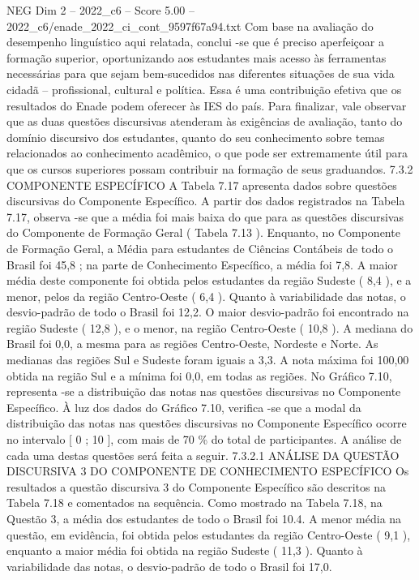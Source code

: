 \begin{textsample}{NEG Dim 2 – 2022\_c6 – Score 5.00 – 2022\_c6/enade\_2022\_ci\_cont\_9597f67a94.txt}
Com base na avaliação do desempenho linguístico aqui relatada, conclui -se que é preciso aperfeiçoar a formação superior, oportunizando aos estudantes mais acesso às ferramentas necessárias para que sejam bem-sucedidos nas diferentes situações de sua vida cidadã – profissional, cultural e política.
Essa é uma contribuição efetiva que os resultados do Enade podem oferecer às IES do país.
Para finalizar, vale observar que as duas questões discursivas atenderam às exigências de avaliação, tanto do domínio discursivo dos estudantes, quanto do seu conhecimento sobre temas relacionados ao conhecimento acadêmico, o que pode ser extremamente útil para que os cursos superiores possam contribuir na formação de seus graduandos. 7.3.2 COMPONENTE ESPECÍFICO A Tabela 7.17 apresenta dados sobre questões discursivas do Componente Específico.
A partir dos dados registrados na Tabela 7.17, observa -se que a média foi mais baixa do que para as questões discursivas do Componente de Formação Geral ( Tabela 7.13 ).
Enquanto, no Componente de Formação Geral, a Média para estudantes de Ciências Contábeis de todo o Brasil foi 45,8 ; na parte de Conhecimento Específico, a média foi 7,8.
A maior média deste componente foi obtida pelos estudantes da região Sudeste ( 8,4 ), e a menor, pelos da região Centro-Oeste ( 6,4 ).
Quanto à variabilidade das notas, o desvio-padrão de todo o Brasil foi 12,2.
O maior desvio-padrão foi encontrado na região Sudeste ( 12,8 ), e o menor, na região Centro-Oeste ( 10,8 ).
A mediana do Brasil foi 0,0, a mesma para as regiões Centro-Oeste, Nordeste e Norte.
As medianas das regiões Sul e Sudeste foram iguais a 3,3.
A nota máxima foi 100,00 obtida na região Sul e a mínima foi 0,0, em todas as regiões.
No Gráfico 7.10, representa -se a distribuição das notas nas questões discursivas no Componente Específico.
À luz dos dados do Gráfico 7.10, verifica -se que a modal da distribuição das notas nas questões discursivas no Componente Específico ocorre no intervalo [ 0 ; 10 ], com mais de 70 \% do total de participantes.
A análise de cada uma destas questões será feita a seguir. 7.3.2.1 ANÁLISE DA QUESTÃO DISCURSIVA 3 DO COMPONENTE DE CONHECIMENTO ESPECÍFICO Os resultados a questão discursiva 3 do Componente Específico são descritos na Tabela 7.18 e comentados na sequência.
Como mostrado na Tabela 7.18, na Questão 3, a média dos estudantes de todo o Brasil foi 10.4.
A menor média na questão, em evidência, foi obtida pelos estudantes da região Centro-Oeste ( 9,1 ), enquanto a maior média foi obtida na região Sudeste ( 11,3 ).
Quanto à variabilidade das notas, o desvio-padrão de todo o Brasil foi 17,0.

\end{textsample}
